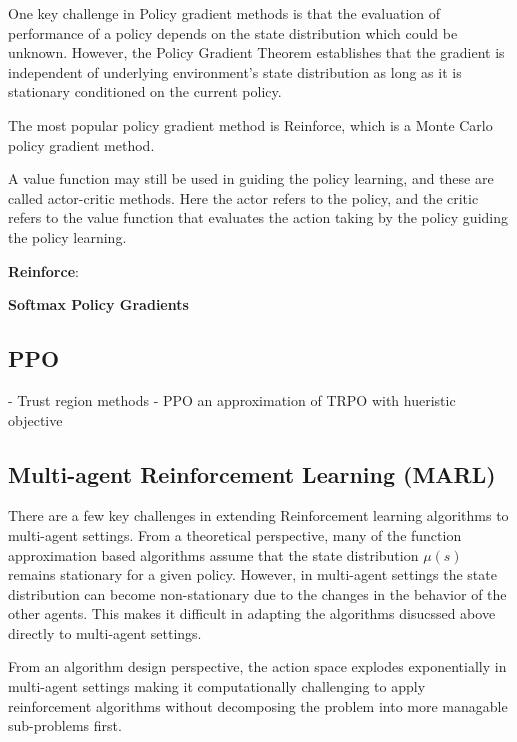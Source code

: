 One key challenge in Policy gradient methods is that the evaluation of performance of a policy
depends on the state distribution which could be unknown.
However, the Policy Gradient Theorem establishes that the gradient is independent of underlying
environment's state distribution as long as it is stationary conditioned on the current policy.

The most popular policy gradient method is Reinforce, which is a Monte Carlo policy gradient
method.

A value function may still be used in guiding the policy learning, and these are called actor-critic methods.
Here the actor refers to the policy, and the critic refers to the value function that evaluates the
action taking by the policy guiding the policy learning.

\textbf{Reinforce}: 

\textbf{Softmax Policy Gradients}


\subsection{PPO}

- Trust region methods
- PPO an approximation of TRPO with hueristic objective

\subsection{Multi-agent Reinforcement Learning (MARL)}\label{sec:marl}

There are a few key challenges in extending Reinforcement learning algorithms to multi-agent
settings.
From a theoretical perspective, many of the function approximation based algorithms assume that the
state distribution $\mu(s)$ remains stationary for a given policy.
However, in multi-agent settings the state distribution can become non-stationary due to the
changes in the behavior of the other agents.
This makes it difficult in adapting the algorithms disucssed above directly to multi-agent
settings.

From an algorithm design perspective, the action space explodes exponentially in multi-agent
settings making it computationally challenging to apply reinforcement algorithms without
decomposing the problem into more managable sub-problems first.

